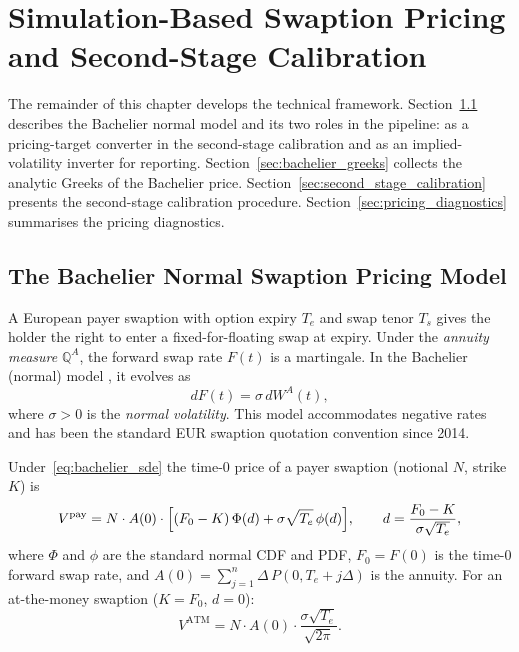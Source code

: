 \chapter{Simulation-Based Swaption Pricing and Second-Stage Calibration}
\label{chap:pricing_methodology}



The remainder of this chapter develops the technical framework.
Section~\ref{sec:bachelier_model} describes the Bachelier normal
model and its two roles in the pipeline: as a pricing-target converter in the second-stage
calibration and as an implied-volatility inverter for reporting.
Section~\ref{sec:bachelier_greeks} collects the analytic Greeks of the Bachelier price.
Section~\ref{sec:second_stage_calibration} presents the second-stage calibration
procedure. Section~\ref{sec:pricing_diagnostics} summarises the pricing diagnostics.

\section{The Bachelier Normal Swaption Pricing Model}
\label{sec:bachelier_model}

A European payer swaption with option expiry $T_e$ and swap tenor $T_s$ gives the
holder the right to enter a fixed-for-floating swap at expiry. Under the
\emph{annuity measure} $\mathbb{Q}^A$, the forward swap rate $F(t)$ is a martingale.
In the Bachelier (normal) model \citep{Bachelier1900}, it evolves as
\begin{equation}
    dF(t) = \sigma\, dW^A(t),
    \label{eq:bachelier_sde}
\end{equation}
where $\sigma > 0$ is the \emph{normal volatility}. This model accommodates negative
rates and has been the standard EUR swaption quotation convention since 2014.

Under~\eqref{eq:bachelier_sde} the time-$0$ price of a payer swaption (notional $N$,
strike $K$) is
\begin{equation}
    V^{\mathrm{pay}}
    =
    N \cdot A(0) \cdot
    \Bigl[
        (F_0 - K)\,\Phi(d)
        +
        \sigma\sqrt{T_e}\,\phi(d)
    \Bigr],
    \qquad
    d = \frac{F_0 - K}{\sigma\sqrt{T_e}},
    \label{eq:bachelier_payer}
\end{equation}
where $\Phi$ and $\phi$ are the standard normal CDF and PDF, $F_0=F(0)$ is the
time-$0$ forward swap rate, and $A(0)=\sum_{j=1}^{n}\Delta\,P(0,T_e+j\Delta)$ is the
annuity. For an at-the-money swaption ($K=F_0$, $d=0$):
\begin{equation}
    V^{\mathrm{ATM}}
    =
    N \cdot A(0) \cdot \frac{\sigma\sqrt{T_e}}{\sqrt{2\pi}}.
    \label{eq:bachelier_atm}
\end{equation}

